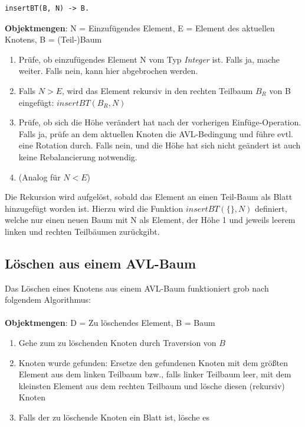 \documentclass{article}
\begin{document}
\begin{lstlisting}
insertBT(B, N) -> B.
\end{lstlisting}

	\textbf{Objektmengen}: N = Einzufügendes Element, E = Element des aktuellen Knotens, B = (Teil-)Baum
	
	\begin{enumerate}
		\item Prüfe, ob einzufügendes Element N vom Typ \textit{Integer} ist. Falls ja, mache weiter. Falls nein, kann hier abgebrochen werden.
		\item Falls $N > E$, wird das Element rekursiv in den rechten Teilbaum $B_R$ von B eingefügt: $insertBT(B_R, N)$
		\item Prüfe, ob sich die Höhe verändert hat nach der vorherigen Einfüge-Operation. Falls ja, prüfe an dem aktuellen Knoten die AVL-Bedingung und führe evtl. eine Rotation durch. Falls nein, und die Höhe hat sich nicht geändert ist auch keine Rebalancierung notwendig. 
		\item (Analog für $N < E$)
	\end{enumerate}
	
	Die Rekursion wird aufgelöst, sobald das Element an einen Teil-Baum als Blatt hinzugefügt worden ist. Hierzu wird die Funktion $insertBT(\{\}, N)$ definiert, welche nur einen neuen Baum mit N als Element, der Höhe 1 und jeweils leerem linken und rechten Teilbäumen zurückgibt.
	
	\newpage
	\subsection{Löschen aus einem AVL-Baum}

	Das Löschen eines Knotens aus einem AVL-Baum funktioniert grob nach folgendem Algorithmus:
	\\\\
	\textbf{Objektmengen}: D = Zu löschendes Element, B = Baum
	
	\begin{enumerate}
		\item Gehe zum zu löschenden Knoten durch Traversion von $B$
		\item Knoten wurde gefunden: Ersetze den gefundenen Knoten mit dem größten Element aus dem linken Teilbaum bzw., falls linker Teilbaum leer, mit dem kleinsten Element aus dem rechten Teilbaum und lösche diesen (rekursiv) Knoten
		\item Falls der zu löschende Knoten ein Blatt ist, lösche es
	\end{enumerate}
	
\end{document}
